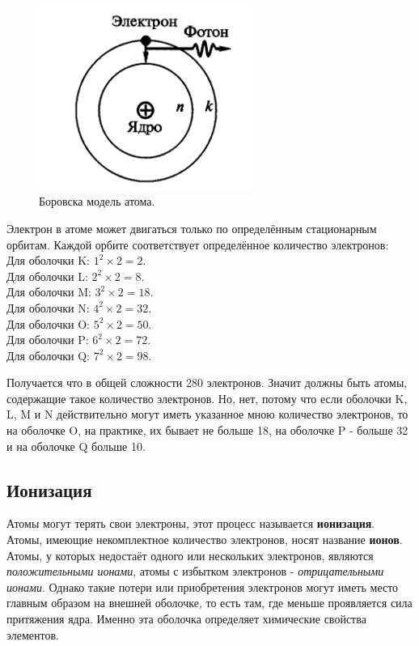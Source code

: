 	\begin{figure}[h]
		\centering
		\includegraphics[height=6cm]{img/2} 
		\captionsetup{font=footnotesize}
		\caption{Боровска модель атома.} 
	\end{figure}
	
	
	\par Электрон в атоме может двигаться только по определённым стационарным орбитам. Каждой орбите соответствует определённое количество электронов: 
	\\
	Для оболочки K: $1^{2} \times 2 = 2$. \\
	Для оболочки L: $2^{2} \times 2 = 8$. \\
	Для оболочки M: $3^{2} \times 2 = 18$. \\
	Для оболочки N: $4^{2} \times 2 = 32$. \\
	Для оболочки O: $5^{2} \times 2 = 50$. \\
	Для оболочки P: $6^{2} \times 2 = 72$. \\
	Для оболочки Q: $7^{2} \times 2 = 98$.
	
	\par Получается что в общей сложности 280 электронов. Значит должны быть атомы, содержащие такое количество электронов. Но, нет, потому что если оболочки K, L, M и N действительно могут иметь указанное мною количество электронов, то на оболочке O, на практике, их бывает не больше 18, на оболочке P - больше 32 и на оболочке Q больше 10. 
	
	\clearpage
 
    \subsection{Ионизация}
    
	\par Атомы могут терять свои электроны, этот процесс называется \textbf{ионизация}. Атомы, имеющие некомплектное количество электронов, носят название \textbf{ионов}. Атомы, у которых недостаёт одного или нескольких электронов, являются \textit{положительными ионами}, атомы с избытком электронов - \textit{отрицательными ионами}. Однако такие потери или приобретения электронов могут иметь место главным образом на внешней оболочке, то есть там, где меньше проявляется сила притяжения ядра. Именно эта оболочка определяет химические свойства элементов. 
	
